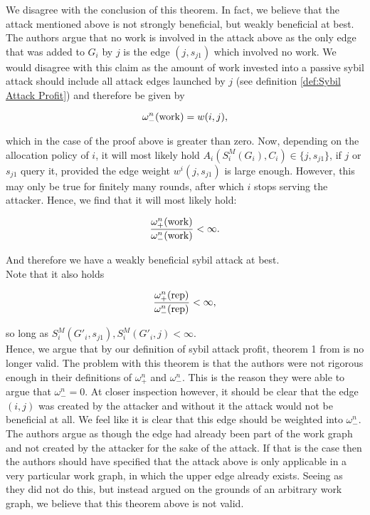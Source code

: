 \noindent{}We disagree with the conclusion of this theorem. In fact, we believe that the attack mentioned above is not strongly beneficial, but weakly beneficial at best. The authors argue that no work is involved in the attack above as the only edge that was added to $G_i$ by $j$ is the edge $(j,s_{j1})$ which involved no work. We would disagree with this claim as the amount of work invested into a passive sybil attack should include all attack edges launched by $j$ (see definition \ref{def:Sybil Attack Profit}) and therefore be given by

\[
\omega_{-}^n({\rm work}) = w(i,j),
\]

\noindent{}which in the case of the proof above is greater than zero. Now, depending on the allocation policy of $i$, it will most likely hold $A_i(S^M_i(G_i),C_i)\in{}\lbrace{}j,s_{j1}\rbrace$, if $j$ or $s_{j1}$ query it, provided the edge weight $w^i(j,s_{j1})$ is large enough. However, this may only be true for finitely many rounds, after which $i$ stops serving the attacker. Hence, we find that it will most likely hold:

\[
\frac{\omega_{+}^n({\rm work})}{\omega_{-}^n({\rm work})}<\infty.
\]

\noindent{}And therefore we have a weakly beneficial sybil attack at best. \vspace{1em}\\

\noindent{}Note that it also holds 

\[
\frac{\omega_{+}^n({\rm rep})}{\omega_{-}^n({\rm rep})}<\infty,
\]

\noindent{}so long as $S^M_i(G'_i,s_{j1}), S^M_i(G'_i,j)<\infty$. \vspace{1em}\\

\noindent{}Hence, we argue that by our definition of sybil attack profit, theorem 1 from \cite{On the Sybil-Proofness of Accounting Mechanisms} is no longer valid. The problem with this theorem is that the authors were not rigorous enough in their definitions of $\omega_{+}^n$ and $\omega_{-}^n$. This is the reason they were able to argue that $\omega_{-}^n=0$. At closer inspection however, it should be clear that the edge $(i,j)$ was created by the attacker and without it the attack would not be beneficial at all. We feel like it is clear that this edge should be weighted into $\omega_{-}^n$. The authors argue as though the edge had already been part of the work graph and not created by the attacker for the sake of the attack. If that is the case then the authors should have specified that the attack above is only applicable in a very particular work graph, in which the upper edge already exists. Seeing as they did not do this, but instead argued on the grounds of an arbitrary work graph, we believe that this theorem above is not valid. \vspace{1em}\\

